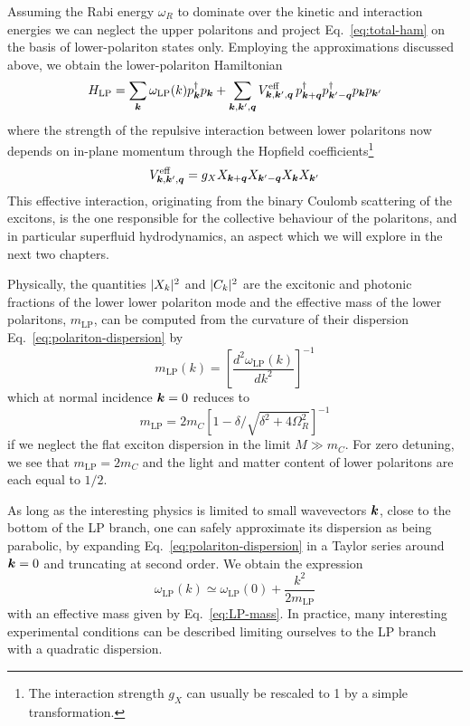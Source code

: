 Assuming the Rabi energy $\omega_R$ to dominate over the kinetic and
interaction energies we can neglect the upper polaritons and project
Eq.~\eqref{eq:total-ham} on the basis of lower-polariton states
only. Employing the approximations discussed above, we obtain the
lower-polariton Hamiltonian
%
\begin{equation}\label{eq:LP-ham}
  H_{\text{LP}} = \sum_{\bm{k}} \omega_{\text{LP}}(k) p_{\bm{k}}^{\dagger} p_{\bm{k}} + \sum_{\bm{k},\bm{k}^{\prime},\bm{q}} V^{\text{eff}}_{\bm{k},\bm{k}^{\prime},\bm{q}}\, p^{\dagger}_{\bm{k} + \bm{q}} p^{\dagger}_{\bm{k}^{\prime} - \bm{q}} p_{\bm{k}} p_{\bm{k}^{\prime}}
\end{equation}
% 
where the strength of the repulsive interaction between lower
polaritons now depends on in-plane momentum through the Hopfield
coefficients\footnote{The interaction strength $g_X$ can usually be
  rescaled to 1 by a simple transformation.}
%
\begin{equation}\label{eq:g-eff}
  V^{\text{eff}}_{\bm{k},\bm{k}^{\prime},\bm{q}} = g_X X_{\bm{k} + \bm{q}}X_{\bm{k}^{\prime} - \bm{q}}X_{\bm{k}}X_{\bm{k}^{\prime}}
\end{equation}
% 
This effective interaction, originating from the binary Coulomb
scattering of the excitons, is the one responsible for the collective
behaviour of the polaritons, and in particular superfluid
hydrodynamics, an aspect which we will explore in the next two chapters.

Physically, the quantities $\vert X_k \vert^2$ and $\vert C_k \vert^2$ are the
excitonic and photonic fractions of the lower lower polariton
mode and the effective mass of the lower polaritons, $m_{\text{LP}}$, can
be computed from the curvature of their dispersion
Eq.~\eqref{eq:polariton-dispersion} by
%
\begin{equation}\label{eq:LP-mass-def}
  m_{\text{LP}}(k) = \left[\frac{d^2 \omega_{\text{LP}}(k)}{dk^2}\right]^{-1}
\end{equation}
% 
which at normal incidence $\bm{k} = 0$ reduces to 
%
\begin{equation}\label{eq:LP-mass}
  m_{\text{LP}} = 2m_C \left[1 - \delta/\sqrt{\delta^2 + 4\Omega_R^2}\right]^{-1}
\end{equation}
% 
if we neglect the flat exciton dispersion in the limit $M \gg
m_C$. For zero detuning, we see that $m_{\text{LP}} = 2m_C$ and the
light and matter content of lower polaritons are each equal to $1/2$.

As long as the interesting physics is limited to small wavevectors
$\bm{k}$, close to the bottom of the LP branch, one can safely
approximate its dispersion as being parabolic, by expanding
Eq.~\eqref{eq:polariton-dispersion} in a Taylor series around
$\bm{k} = 0$ and truncating at second order. We obtain the expression
%
\begin{equation}\label{eq:parabolic-disp}
  \omega_{\text{LP}}(k) \simeq \omega_{\text{LP}}(0) + \frac{k^2}{2m_{\text{LP}}}
\end{equation}
% 
with an effective mass given by Eq.~\eqref{eq:LP-mass}. In practice,
many interesting experimental conditions can be described limiting
ourselves to the LP branch with a quadratic dispersion.


